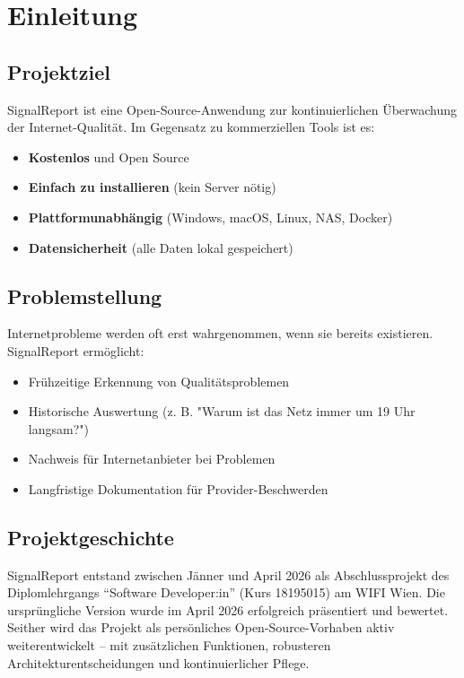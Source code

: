 \section{Einleitung}
\label{sec:einleitung}

\subsection{Projektziel}
SignalReport ist eine Open-Source-Anwendung zur kontinuierlichen Überwachung der Internet-Qualität. Im Gegensatz zu kommerziellen Tools ist es:

\begin{itemize}
    \item \textbf{Kostenlos} und Open Source
    \item \textbf{Einfach zu installieren} (kein Server nötig)
    \item \textbf{Plattformunabhängig} (Windows, macOS, Linux, NAS, Docker)
    \item \textbf{Datensicherheit} (alle Daten lokal gespeichert)
\end{itemize}

\subsection{Problemstellung}
Internetprobleme werden oft erst wahrgenommen, wenn sie bereits existieren. SignalReport ermöglicht:

\begin{itemize}
    \item Frühzeitige Erkennung von Qualitätsproblemen
    \item Historische Auswertung (z. B. "Warum ist das Netz immer um 19 Uhr langsam?")
    \item Nachweis für Internetanbieter bei Problemen
    \item Langfristige Dokumentation für Provider-Beschwerden
\end{itemize}

\subsection{Projektgeschichte}
SignalReport entstand zwischen Jänner und April 2026 als Abschlussprojekt des Diplomlehrgangs \enquote{Software Developer:in} (Kurs 18195015) am WIFI Wien. Die ursprüngliche Version wurde im April 2026 erfolgreich präsentiert und bewertet. Seither wird das Projekt als persönliches Open-Source-Vorhaben aktiv weiterentwickelt -- mit zusätzlichen Funktionen, robusteren Architekturentscheidungen und kontinuierlicher Pflege.

